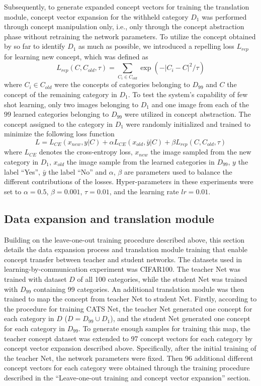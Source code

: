 \documentclass[pdflatex,sn-mathphys-num,lineno]{sn-jnl}%
\begin{document}
\begin{CJK}{UTF8}{gbsn}
Subsequently, to generate expanded concept vectors for training the translation module, concept vector expansion for the withheld category $D_1$ was performed through concept manipulation only, i.e., only through the concept abstraction phase without retraining the network parameters. To utilize the concept obtained by so far to identify $D_1$ as much as possible, we introduced a repelling loss $L_{rep}$ for learning new concept, which was defined as
$$L_{rep}(C, C_{old}, \tau) = \sum_{C_i \in C_{old}} \exp (-|C_i - C|^2/\tau)$$
where $C_i \in C_{old}$ were the concepts of categories belonging to $D_{99}$ and $C$ the concept of the remaining category in $D_1$. To test the system’s capability of few shot learning, only two images belonging to $D_1$ and one image from each of the $99$ learned categories belonging to $D_{99}$ were utilized in concept abstraction. The concept assigned to the category in $D_1$ were randomly initialized and trained to minimize the following loss function
$$L = L_{CE}(x_{new},y|C) + \alpha L_{CE}(x_{old},\bar{y}|C) + \beta L_{rep}(C, C_{old}, \tau)$$
where $L_{CE}$ denotes the cross-entropy loss, $x_{new}$ the image sampled from the new category in $D_1$, $x_{old}$ the image sample from the learned categories in $D_{99}$, $y$ the label “Yes”, $\bar{y}$ the label “No” and $\alpha$, $\beta$ are parameters used to balance the different contributions of the losses. Hyper-parameters in these experiments were set to $\alpha = 0.5$, $\beta = 0.001$, $\tau = 0.01$, and the learning rate $ lr = 0.01$. 

\subsection{Data expansion and translation module}
Building on the leave-one-out training procedure described above, this section details the data expansion process and translation module training that enable concept transfer between teacher and student networks. The datasets used in learning-by-communication experiment was CIFAR100. The teacher Net was trained with dataset $D$ of all 100 categories, while the student Net was trained with $D_{99}$ containing 99 categories. An additional translation module was then trained to map the concept from teacher Net to student Net. Firstly, according to the procedure for training CATS Net, the teacher Net generated one concept for each category in $D$ ($D = D_{99} \cup D_1$), and the student Net generated one concept for each category in $D_{99}$. To generate enough samples for training this map, the teacher concept dataset was extended to 97 concept vectors for each category by concept vector expansion described above. Specifically, after the initial training of the teacher Net, the network parameters were fixed. Then 96 additional different concept vectors for each category were obtained through the training procedure described in the “Leave-one-out training and concept vector expansion” section. 


\end{CJK}
\end{document}
